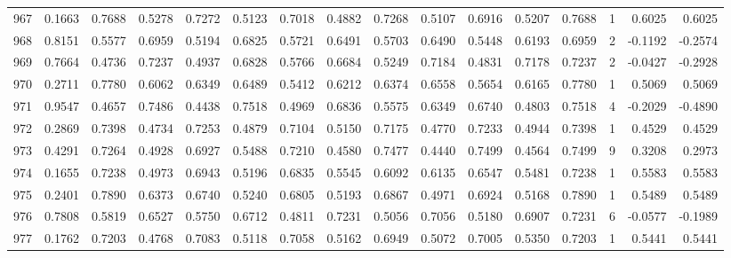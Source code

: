 \begin{tabular}{lrrrrrrrrrrrrrrr}
967 &      0.1663 &  0.7688 &  0.5278 &  0.7272 &  0.5123 &  0.7018 &  0.4882 &  0.7268 &  0.5107 &  0.6916 &   0.5207 &     0.7688 &      1 &                    0.6025 &                     0.6025 \\
968 &      0.8151 &  0.5577 &  0.6959 &  0.5194 &  0.6825 &  0.5721 &  0.6491 &  0.5703 &  0.6490 &  0.5448 &   0.6193 &     0.6959 &      2 &                   -0.1192 &                    -0.2574 \\
969 &      0.7664 &  0.4736 &  0.7237 &  0.4937 &  0.6828 &  0.5766 &  0.6684 &  0.5249 &  0.7184 &  0.4831 &   0.7178 &     0.7237 &      2 &                   -0.0427 &                    -0.2928 \\
970 &      0.2711 &  0.7780 &  0.6062 &  0.6349 &  0.6489 &  0.5412 &  0.6212 &  0.6374 &  0.6558 &  0.5654 &   0.6165 &     0.7780 &      1 &                    0.5069 &                     0.5069 \\
971 &      0.9547 &  0.4657 &  0.7486 &  0.4438 &  0.7518 &  0.4969 &  0.6836 &  0.5575 &  0.6349 &  0.6740 &   0.4803 &     0.7518 &      4 &                   -0.2029 &                    -0.4890 \\
972 &      0.2869 &  0.7398 &  0.4734 &  0.7253 &  0.4879 &  0.7104 &  0.5150 &  0.7175 &  0.4770 &  0.7233 &   0.4944 &     0.7398 &      1 &                    0.4529 &                     0.4529 \\
973 &      0.4291 &  0.7264 &  0.4928 &  0.6927 &  0.5488 &  0.7210 &  0.4580 &  0.7477 &  0.4440 &  0.7499 &   0.4564 &     0.7499 &      9 &                    0.3208 &                     0.2973 \\
974 &      0.1655 &  0.7238 &  0.4973 &  0.6943 &  0.5196 &  0.6835 &  0.5545 &  0.6092 &  0.6135 &  0.6547 &   0.5481 &     0.7238 &      1 &                    0.5583 &                     0.5583 \\
975 &      0.2401 &  0.7890 &  0.6373 &  0.6740 &  0.5240 &  0.6805 &  0.5193 &  0.6867 &  0.4971 &  0.6924 &   0.5168 &     0.7890 &      1 &                    0.5489 &                     0.5489 \\
976 &      0.7808 &  0.5819 &  0.6527 &  0.5750 &  0.6712 &  0.4811 &  0.7231 &  0.5056 &  0.7056 &  0.5180 &   0.6907 &     0.7231 &      6 &                   -0.0577 &                    -0.1989 \\
977 &      0.1762 &  0.7203 &  0.4768 &  0.7083 &  0.5118 &  0.7058 &  0.5162 &  0.6949 &  0.5072 &  0.7005 &   0.5350 &     0.7203 &      1 &                    0.5441 &                     0.5441 \\

\end{tabular}
